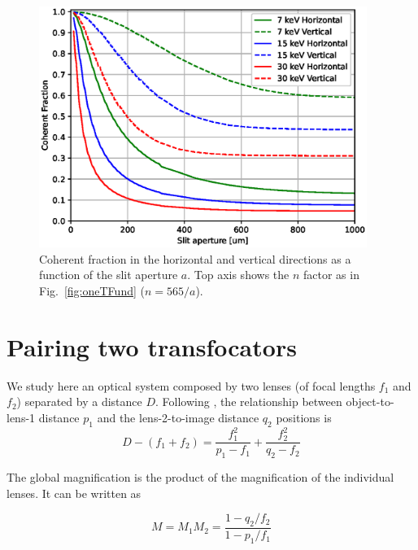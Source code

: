 \documentclass{iucr}              %
\begin{document}
\begin{figure}
    \centering
    \includegraphics[width=0.95\textwidth]{figures/cf_vs_aperture.eps}

    \caption{
    Coherent fraction in the horizontal and vertical directions as a function of the slit aperture $a$. Top axis shows the $n$ factor as in Fig.~\ref{fig:oneTFund} ($n=565/a$).
    }
    \label{fig:cf_vs_aperture}
\end{figure}





\section{Pairing two transfocators}


We study here an optical system composed by two lenses (of focal lengths $f_1$ and $f_2$) separated by a distance $D$. Following \cite{Goodman85}, the relationship between object-to-lens-1 distance $p_1$ and the lens-2-to-image distance $q_2$ positions is
\begin{equation}
\label{eq:twolens}
    D-(f_1+f_2)=\frac{f_1^2}{p_1-f_1} + \frac{f_2^2}{q_2-f_2}
\end{equation}

The global magnification is the product of the magnification of the individual lenses. It can be written as

\begin{equation}
\label{eq:magnification}
    M=M_1 M_2=\frac{1-q_2/f_2}{1-p_1/f_1}
\end{equation}
\end{document}
